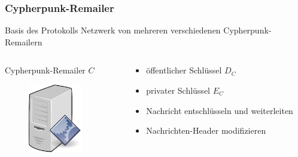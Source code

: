 \documentclass{beamer}
\begin{document}
\begin{frame}
	\frametitle{Cypherpunk-Remailer}
	\begin{block}{Basis des Protokolls}
		Netzwerk von mehreren verschiedenen Cypherpunk-Remailern
	\end{block}
	\begin{columns}[T]
		\begin{column}[T]{5cm}
			\begin{center}
			Cypherpunk-Remailer \(C\) \\   

			\begin{figure}
			\includegraphics[height=3cm]{bilder/remailer.eps}
			\end{figure}
			\end{center}
		\end{column}
		\begin{column}[T]{5cm}
			\begin{center}	
			\begin{itemize}
				\item öffentlicher Schlüssel \(D_{C}\)
				\item privater Schlüssel \(E_{C}\)
				\item Nachricht entschlüsseln und weiterleiten
				\item Nachrichten-Header modifizieren
			\end{itemize}	
			\end{center}
		\end{column}
	\end{columns}
\end{frame}
\end{document}
